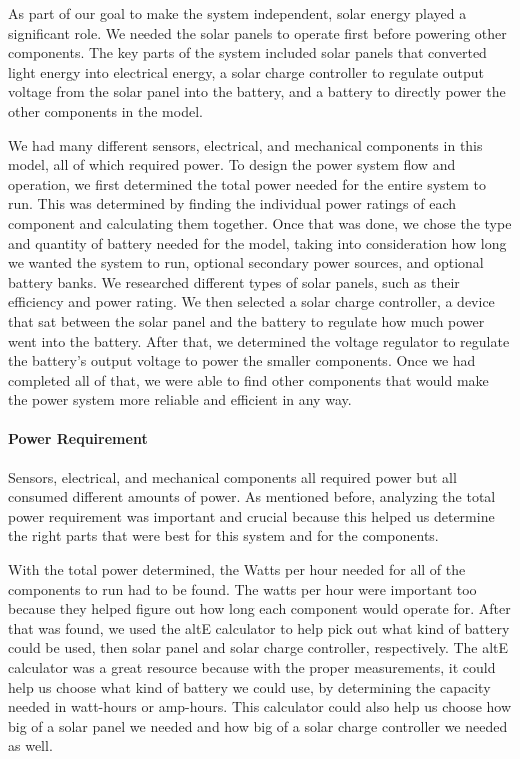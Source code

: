 As part of our goal to make the system independent, solar energy played a significant role. We needed the solar panels to operate first before powering other components. The key parts of the system included solar panels that converted light energy into electrical energy, a solar charge controller to regulate output voltage from the solar panel into the battery, and a battery to directly power the other components in the model.

We had many different sensors, electrical, and mechanical components in this model, all of which required power. To design the power system flow and operation, we first determined the total power needed for the entire system to run. This was determined by finding the individual power ratings of each component and calculating them together. Once that was done, we chose the type and quantity of battery needed for the model, taking into consideration how long we wanted the system to run, optional secondary power sources, and optional battery banks. We researched different types of solar panels, such as their efficiency and power rating. We then selected a solar charge controller, a device that sat between the solar panel and the battery to regulate how much power went into the battery. After that, we determined the voltage regulator to regulate the battery's output voltage to power the smaller components. Once we had completed all of that, we were able to find other components that would make the power system more reliable and efficient in any way.
\paragraph{Power Requirement}
Sensors, electrical, and mechanical components all required power but all consumed different amounts of power. As mentioned before, analyzing the total power requirement was important and crucial because this helped us determine the right parts that were best for this system and for the components.

With the total power determined, the Watts per hour needed for all of the components to run had to be found. The watts per hour were important too because they helped figure out how long each component would operate for. After that was found, we used the altE calculator to help pick out what kind of battery could be used, then solar panel and solar charge controller, respectively. The altE calculator was a great resource because with the proper measurements, it could help us choose what kind of battery we could use, by determining the capacity needed in watt-hours or amp-hours. This calculator could also help us choose how big of a solar panel we needed and how big of a solar charge controller we needed as well.
